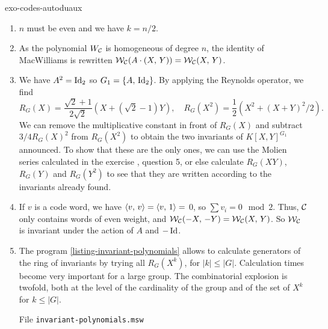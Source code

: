  
\begin{correction}{exo-codes-autoduaux}
\begin{enumerate}
\item $ n $ must be even and we have $ k = n/2 $.
\item As the polynomial $ W_{\mathcal{C}} $ is homogeneous of degree $ n $, the identity of MacWilliams is rewritten $ \mathcal{W}_{\mathcal{C}} (A \cdot (X, \, Y)) = \mathcal{W}_{\mathcal{C}} (X, \, Y) $.
\item We have $ A^2 = \operatorname{Id}_2 $ so $ G_1 = \{A, \, \operatorname{Id}_2\} $. By applying the Reynolds operator, we find
\begin{equation*}
R_G (X) = \frac{\sqrt{2} +1}{2 \sqrt{2}} (X + (\sqrt{2} -1) Y), \quad R_G (X^2) = \frac{1}{2} (X^2 + (X + Y)^2/2).
\end{equation*}
We can remove the multiplicative constant in front of $ R_G (X) $ and subtract $ 3/4 R_G (X)^2 $ from $ R_G (X^2) $ to obtain the two invariants of $ K [X, Y]^{G_1} $ announced. To show that these are the only ones, we can use the Molien series calculated in the exercise , question 5, or else calculate $ R_G (XY) $, $ R_G (Y) $ and $ R_G (Y^2) $ to see that they are written according to the invariants already found.
\item {} If $ v $ is a code word, we have $ \langle v,\,v\rangle = \langle v,\,1\rangle = $ 0, so $ \sum{v_i} = 0 \mod{2} $. Thus, $ \mathcal{C} $ only contains words of even weight, and $ \mathcal{W}_{\mathcal{C}} (-X, \, - Y) = \mathcal{W}_{\mathcal{C}} (X, \, Y) $. So $ \mathcal{W}_{\mathcal{C}} $ is invariant under the action of $ A $ and $ - \operatorname{Id} $.
\item The program \ref{listing-invariant-polynomials} allows to calculate generators of the ring of invariants by trying all $ R_G (X^k) $, for $ | k | \leq |G| $. Calculation times become very important for a large group. The combinatorial explosion is twofold, both at the level of the cardinality of the group and of the set of $ X^k $ for $ k \leq |G| $.
 
\begin{listing} \begin{footnotesize}

\end{footnotesize}
\caption{File \texttt{invariant-polynomials.msw}}
\label{listing-invariant-polynomials}
\end{listing}
\end{enumerate}
\end{correction}

